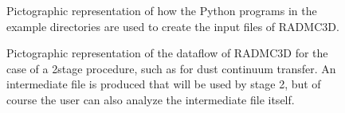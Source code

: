 \documentclass[letterpaper,10pt,english]{sphinxmanual}
\begin{document}
\begin{figure}[htbp]
\centering
\capstart

\noindent{}
\caption{Pictographic representation of how the Python programs in the example directories
are used to create the input files of RADMC\sphinxhyphen{}3D.}\label{\detokenize{basicstructure:id3}}\label{\detokenize{basicstructure:fig-dataflow-basic-python}}\end{figure}

\begin{figure}[htbp]
\centering
\capstart

\noindent{}
\caption{Pictographic representation of the dataflow of RADMC\sphinxhyphen{}3D for the case
of a 2\sphinxhyphen{}stage procedure, such as for dust continuum transfer. An intermediate
file is produced that will be used by stage 2, but of course the user can
also analyze the intermediate file itself.}\label{\detokenize{basicstructure:id4}}\label{\detokenize{basicstructure:fig-dataflow-twostage-python}}\end{figure}
\end{document}
